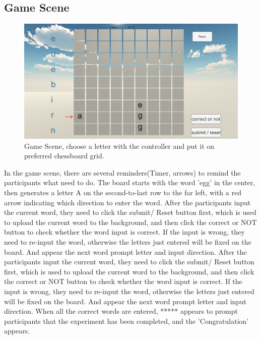 \documentclass{vgtc}                          %
\begin{document}
\subsection{ Game Scene}
\begin{figure}[H]
 \centering
 \includegraphics[width=\columnwidth]{pictures/GameScene.png}
 \caption{Game Scene, choose a letter with the controller and put it on preferred chessboard grid.}
 \label{fig:5}
\end{figure}
In the game scene, there are several reminders(Timer, arrows) to remind the participants what need to do. The board starts with the word 'egg' in the center, then generates a letter A on the second-to-last row to the far left, with a red arrow indicating which direction to enter the word. After the participants input the current word, they need to click the submit/ Reset button first, which is used to upload the current word to the background, and then click the correct or NOT button to check whether the word input is correct. If the input is wrong, they need to re-input the word, otherwise the letters just entered will be fixed on the board.  And appear the next word prompt letter and input direction. After the participants input the current word, they need to click the submit/ Reset button first, which is used to upload the current word to the background, and then click the correct or NOT button to check whether the word input is correct. If the input is wrong, they need to re-input the word, otherwise the letters just entered will be fixed on the board.  And appear the next word prompt letter and input direction.  When all the correct words are entered, ***** appears to prompt participants that the experiment has been completed, and the 'Congratulation' appears.  
\end{document}
